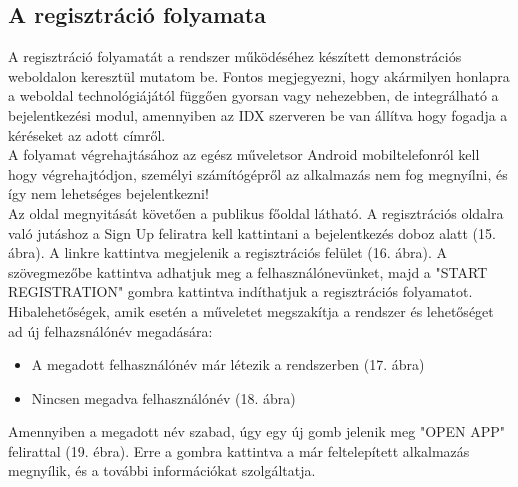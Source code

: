 \subsection{A regisztráció folyamata}
A regisztráció folyamatát a rendszer működéséhez készített demonstrációs weboldalon keresztül mutatom be. Fontos megjegyezni, hogy akármilyen honlapra a weboldal technológiájától függően gyorsan vagy nehezebben, de integrálható a bejelentkezési modul, amennyiben az IDX szerveren be van állítva hogy fogadja a kéréseket az adott címről.
\\A folyamat végrehajtásához az egész műveletsor Android mobiltelefonról kell hogy végrehajtódjon, személyi számítógépről az alkalmazás nem fog megnyílni, és így nem lehetséges bejelentkezni!
\\Az oldal megnyitását követően a publikus főoldal látható. A regisztrációs oldalra való jutáshoz a Sign Up feliratra kell kattintani a bejelentkezés doboz alatt (15. ábra). A linkre kattintva megjelenik a regisztrációs felület (16. ábra). A szövegmezőbe kattintva adhatjuk meg a felhasználónevünket, majd a "START REGISTRATION" gombra kattintva indíthatjuk a regisztrációs folyamatot. Hibalehetőségek, amik esetén a műveletet megszakítja a rendszer és lehetőséget ad új felhazsnálónév megadására:
\begin{itemize}
\item A megadott felhasználónév már létezik a rendszerben (17. ábra)
\item Nincsen megadva felhasználónév (18. ábra)
\end{itemize}

Amennyiben a megadott név szabad, úgy egy új gomb jelenik meg "OPEN APP" felirattal (19. ébra). 
Erre a gombra kattintva a már feltelepített alkalmazás megnyílik, és a további információkat szolgáltatja.

